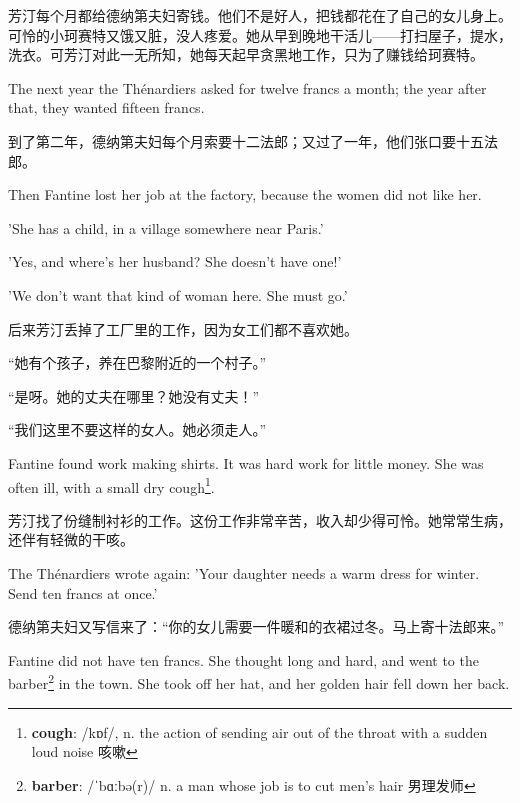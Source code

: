 \documentclass[fontset=ubuntu, zihao=5]{ctexart}
\newcommand\doulos[1]{{\fontspec{Doulos SIL} /#1/}}
\begin{document}
\begin{paracol}{2}
\switchcolumn

芳汀每个月都给德纳第夫妇寄钱。他们不是好人，把钱都花在了自己的女儿身上。可怜的小珂赛特又饿又脏，没人疼爱。她从早到晚地干活儿——打扫屋子，提水，洗衣。可芳汀对此一无所知，她每天起早贪黑地工作，只为了赚钱给珂赛特。

\switchcolumn*

The next year the Thénardiers asked for twelve francs a month; the year after that, they wanted fifteen francs.

\switchcolumn

到了第二年，德纳第夫妇每个月索要十二法郎；又过了一年，他们张口要十五法郎。

\switchcolumn*

Then Fantine lost her job at the factory, because the women did not like her.


'She has a child, in a village somewhere near Paris.'


'Yes, and where's her husband? She doesn't have one!'


'We don't want that kind of woman here. She must go.'


\switchcolumn

后来芳汀丢掉了工厂里的工作，因为女工们都不喜欢她。


“她有个孩子，养在巴黎附近的一个村子。”


“是呀。她的丈夫在哪里？她没有丈夫！”


“我们这里不要这样的女人。她必须走人。”

\switchcolumn*

Fantine found work making shirts. It was hard work for little money. She was
often ill, with a small dry cough\footnote{\textbf{cough}: \doulos{kɒf}, n.
  the action of sending air out of the throat with a sudden loud noise 咳嗽}.

\switchcolumn

芳汀找了份缝制衬衫的工作。这份工作非常辛苦，收入却少得可怜。她常常生病，还伴有轻微的干咳。

\switchcolumn*

The Thénardiers wrote again: 'Your daughter needs a warm dress for winter. Send ten francs at once.'

\switchcolumn

德纳第夫妇又写信来了：“你的女儿需要一件暖和的衣裙过冬。马上寄十法郎来。”

\switchcolumn*

Fantine did not have ten francs. She thought long and hard, and went to the
barber\footnote{\textbf{barber}: \doulos{ˈbɑːbə(r)} n. a man whose job is
  to cut men's hair 男理发师} in the town. She took off her hat, and her
golden hair fell down her back.


\end{paracol}
\end{document}
